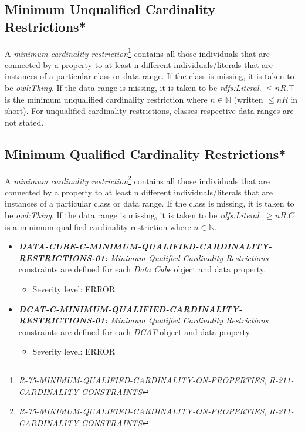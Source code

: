 \documentclass{llncs}
\begin{document}
\subsection{Minimum Unqualified Cardinality Restrictions*}

A \emph{minimum cardinality restriction}\footnote{{\em R-75-MINIMUM-QUALIFIED-CARDINALITY-ON-PROPERTIES}, {\em R-211-CARDINALITY-CONSTRAINTS}} contains all those individuals that are connected by a property to at least n different individuals/literals 
that are instances of a particular class or data range. If the class is missing, it is taken to be \emph{owl:Thing}. 
If the data range is missing, it is taken to be \emph{rdfs:Literal}.
$\leq n R. \top$ is the minimum unqualified cardinality restriction where $n \in \mathbb{N}$ (written $\leq  n R$ in short).
For unqualified cardinality restrictions, classes respective data ranges are not stated.

\subsection{Minimum Qualified Cardinality Restrictions*}

A \emph{minimum cardinality restriction}\footnote{{\em R-75-MINIMUM-QUALIFIED-CARDINALITY-ON-PROPERTIES}, {\em R-211-CARDINALITY-CONSTRAINTS}} contains all those individuals that are connected by a property to at least n different individuals/literals 
that are instances of a particular class or data range. If the class is missing, it is taken to be \emph{owl:Thing}. 
If the data range is missing, it is taken to be \emph{rdfs:Literal}.
$\geq n R. C$ is a minimum qualified cardinality restriction where $n \in \mathbb{N}$.

\begin{itemize}
	\item \textbf{{\em DATA-CUBE-C-MINIMUM-QUALIFIED-CARDINALITY-RESTRICTIONS-01:}}
	{\em Minimum Qualified Cardinality Restrictions} constraints are defined for each \emph{Data Cube} object and data property.
	\begin{itemize}
		\item Severity level: ERROR
	\end{itemize}
\end{itemize}

\begin{itemize}
	\item \textbf{{\em DCAT-C-MINIMUM-QUALIFIED-CARDINALITY-RESTRICTIONS-01:}}
	{\em Minimum Qualified Cardinality Restrictions} constraints are defined for each \emph{DCAT} object and data property.
	\begin{itemize}
		\item Severity level: ERROR
	\end{itemize}
\end{itemize}
\end{document}
